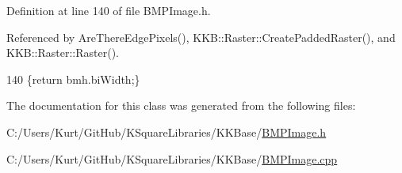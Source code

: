 Definition at line 140 of file B\+M\+P\+Image.\+h.



Referenced by Are\+There\+Edge\+Pixels(), K\+K\+B\+::\+Raster\+::\+Create\+Padded\+Raster(), and K\+K\+B\+::\+Raster\+::\+Raster().


\begin{DoxyCode}
140 \{\textcolor{keywordflow}{return}  bmh.biWidth;\}
\end{DoxyCode}


The documentation for this class was generated from the following files\+:\begin{DoxyCompactItemize}
\item 
C\+:/\+Users/\+Kurt/\+Git\+Hub/\+K\+Square\+Libraries/\+K\+K\+Base/\hyperlink{_b_m_p_image_8h}{B\+M\+P\+Image.\+h}\item 
C\+:/\+Users/\+Kurt/\+Git\+Hub/\+K\+Square\+Libraries/\+K\+K\+Base/\hyperlink{_b_m_p_image_8cpp}{B\+M\+P\+Image.\+cpp}\end{DoxyCompactItemize}
